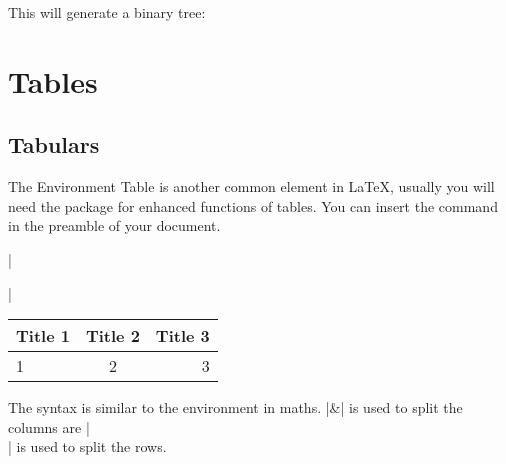 \begin{frame}[fragile]

\begin{example}
\inputminted[firstline=1,lastline=21]{latex}{../graphic/binary_tree.tex}
\end{example}

\end{frame}

\begin{frame}

\begin{exampleblock}{}
\inputminted[firstline=22]{latex}{../graphic/binary_tree.tex}
\end{exampleblock}

This will generate a binary tree:
\begin{center}

\end{center}

\end{frame}


\section{Tables}

\subsection{Tabulars}

\begin{frame}[fragile]{The  Environment}
	Table is another common element in \LaTeX, usually you will need the  package for enhanced functions of tables. You can insert the command in the preamble of your document.

\begin{command}
\LC|\usepackage{array}|
\end{command}

\begin{latexexamplesplit}
\begin{tabular}{|l|c|r|}
  \hline
  Title 1 & Title 2 & Title 3 \\
  \hline
  1 & 2 & 3 \\
  \hline
\end{tabular}
\end{latexexamplesplit}

The syntax is similar to the  environment in maths. \LC|&| is used to split the columns are \LC|\\| is used to split the rows. \medskip



\end{frame}

